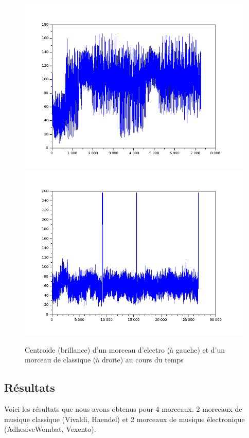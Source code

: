 \documentclass[a4paper]{article}
\begin{document}
\begin{figure}[h!]
\begin{center}
\includegraphics[scale=0.3]{../vexentocentroid.png}
\includegraphics[scale=0.3]{../vivaldicentroid.png}
\caption{Centroide (brillance) d'un morceau d'electro (à gauche) et d'un morceau de classique (à droite) au cours du temps}
\end{center}
\end{figure}
\newpage


\subsection{Résultats}

Voici les résultats que nous avons obtenus pour 4 morceaux. 2 morceaux de musique classique (Vivaldi, Haendel) et 2 morceaux de musique électronique (AdhesiveWombat, Vexento).
\end{document}
